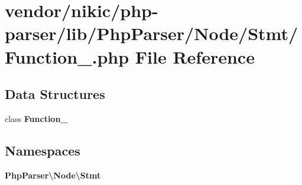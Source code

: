 \section{vendor/nikic/php-\/parser/lib/\+Php\+Parser/\+Node/\+Stmt/\+Function\+\_\+.php File Reference}
\label{_node_2_stmt_2_function___8php}
\subsection*{Data Structures}
\begin{DoxyCompactItemize}
\item 
class {\bf Function\+\_\+}
\end{DoxyCompactItemize}
\subsection*{Namespaces}
\begin{DoxyCompactItemize}
\item 
 {\bf Php\+Parser\textbackslash{}\+Node\textbackslash{}\+Stmt}
\end{DoxyCompactItemize}
